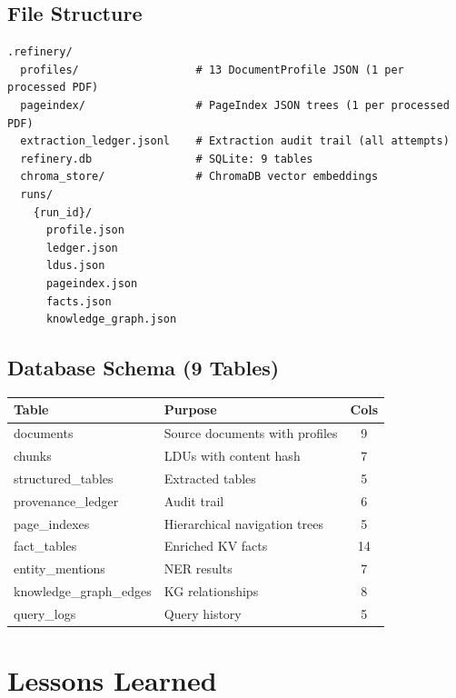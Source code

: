 \documentclass[12pt,a4paper]{article}
\begin{document}
\subsection{File Structure}

\begin{lstlisting}[language={}]
.refinery/
  profiles/                  # 13 DocumentProfile JSON (1 per processed PDF)
  pageindex/                 # PageIndex JSON trees (1 per processed PDF)
  extraction_ledger.jsonl    # Extraction audit trail (all attempts)
  refinery.db                # SQLite: 9 tables
  chroma_store/              # ChromaDB vector embeddings
  runs/
    {run_id}/
      profile.json
      ledger.json
      ldus.json
      pageindex.json
      facts.json
      knowledge_graph.json
\end{lstlisting}

\subsection{Database Schema (9 Tables)}

\begin{center}
\begin{tabular}{llc}
\toprule
\textbf{Table} & \textbf{Purpose} & \textbf{Cols} \\
\midrule
documents          & Source documents with profiles       & 9 \\
chunks             & LDUs with content hash               & 7 \\
structured\_tables & Extracted tables                     & 5 \\
provenance\_ledger & Audit trail                          & 6 \\
page\_indexes      & Hierarchical navigation trees        & 5 \\
fact\_tables       & Enriched KV facts                    & 14 \\
entity\_mentions   & NER results                          & 7 \\
knowledge\_graph\_edges & KG relationships               & 8 \\
query\_logs        & Query history                        & 5 \\
\bottomrule
\end{tabular}
\end{center}


\section{Lessons Learned}
\end{document}
